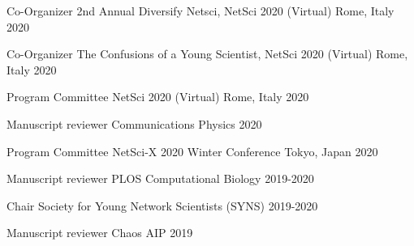 

\begin{cvhonors}

\cvhonor
	{Co-Organizer} %
	{2nd Annual Diversify Netsci, NetSci 2020} %
	{(Virtual) Rome, Italy} %
	{2020} %

\cvhonor
	{Co-Organizer} %
	{The Confusions of a Young Scientist, NetSci 2020} %
	{(Virtual) Rome, Italy} %
	{2020} %

\cvhonor
	{Program Committee} %
	{NetSci 2020} %
	{(Virtual) Rome, Italy} %
	{2020} %

\cvhonor
	{Manuscript reviewer} %
	{Communications Physics} %
	{} %
	{2020} %

\cvhonor
	{Program Committee} %
	{NetSci-X 2020 Winter Conference} %
	{Tokyo, Japan} %
	{2020} %

\cvhonor
	{Manuscript reviewer} %
	{PLOS Computational Biology} %
	{} %
	{2019-2020} %

\cvhonor
	{Chair} %
	{Society for Young Network Scientists (SYNS)} %
	{} %
	{2019-2020} %

\cvhonor
	{Manuscript reviewer} %
	{Chaos AIP} %
	{} %
	{2019} %


\end{cvhonors}
